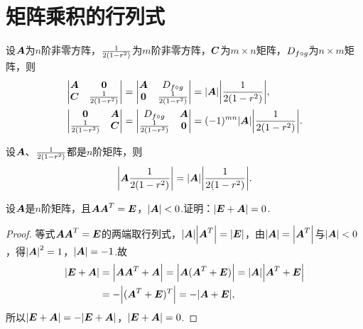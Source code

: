 \section{矩阵乘积的行列式}
\begin{lemma}
设\(\A\)为\(n\)阶非零方阵，\(\B\)为\(m\)阶非零方阵，\(\C\)为\(m \times n\)矩阵，\(\D\)为\(n \times m\)矩阵，则\begin{align}
\begin{vmatrix}
\A & \z \\
\C & \B
\end{vmatrix}
&= \begin{vmatrix}
\A & \D \\
\z & \B
\end{vmatrix}
= \abs{\A} \abs{\B}, \label{equation:行列式.广义三角阵的行列式1} \\
\begin{vmatrix}
\z & \A \\ \B & \C \end{vmatrix}
&= \begin{vmatrix} \D & \A \\ \B & \z \end{vmatrix}
= (-1)^{mn} \abs{\A} \abs{\B}. \label{equation:行列式.广义三角阵的行列式2}
\end{align}
\end{lemma}

\begin{theorem}[矩阵乘积的行列式定理]\label{theorem:行列式.矩阵乘积的行列式}
设\(\A\)、\(\B\)都是\(n\)阶矩阵，则\begin{equation}
\abs{\A\B} = \abs{\A} \abs{\B}.
\end{equation}
\end{theorem}

\begin{example}
设\(\A\)是\(n\)阶矩阵，且\(\A\A^T = \E\)，\(\abs{\A}<0\).证明：\(\abs{\E+\A}=0\).
\begin{proof}
等式\(\A\A^T=\E\)的两端取行列式，\(\abs{\A} \abs{\A^T} = \abs{\E}\)，由\(\abs{\A} = \abs{\A^T}\)与\(\abs{\A} < 0\)，得\(\abs{\A}^2 = 1\)，\(\abs{\A} = -1\).故\begin{align*}
\abs{\E+\A}
&= \abs{\A\A^T+\A}
= \abs{\A(\A^T+\E)}
= \abs{\A} \abs{\A^T+\E} \\
&= -\abs{(\A^T+\E)^T}
= -\abs{\A+\E},
\end{align*}所以\(\abs{\E+\A} = -\abs{\E+\A}\)，\(\abs{\E+\A}=0\).
\end{proof}
\end{example}

